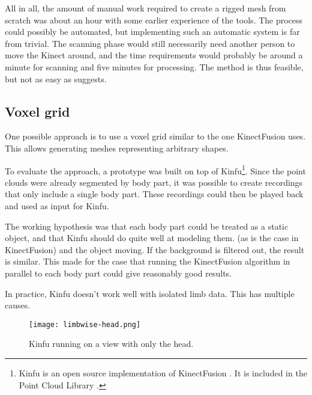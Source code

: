 All in all, the amount of manual work required to create a rigged mesh from scratch was about an hour with some earlier experience of the tools. The process could possibly be automated, but implementing such an automatic system is far from trivial. The scanning phase would still necessarily need another person to move the Kinect around, and the time requirements would probably be around a minute for scanning and five minutes for processing. The method is thus feasible, but not as easy as \citet{charpentier2011accurate} suggests.

\subsection{Voxel grid}

One possible approach is to use a voxel grid similar to the one KinectFusion \autocites{newcombe2011kinectfusion}{izadi2011kinectfusion} uses. This allows generating meshes representing arbitrary shapes.

To evaluate the approach, a prototype was built on top of Kinfu\footnote{Kinfu is an open source implementation of KinectFusion \citep{newcombe2011kinectfusion}. It is included in the Point Cloud Library \citep{PCL}.}. Since the point clouds were already segmented by body part, it was possible to create recordings that only include a single body part. These recordings could then be played back and used as input for Kinfu.

The working hypothesis was that each body part could be treated as a static object, and that Kinfu should do quite well at modeling them.  (as is the case in KinectFusion) and the object moving. If the background is filtered out, the result is similar. This made for the case that running the KinectFusion algorithm in parallel to each body part could give reasonably good results.

In practice, Kinfu doesn't work well with isolated limb data. This has multiple causes. 

\begin{figure}
    \centering
    \texttt{[image: limbwise-head.png]}
    \caption{Kinfu running on a view with only the head.}
    \label{fig:limbwise-head}
\end{figure}

